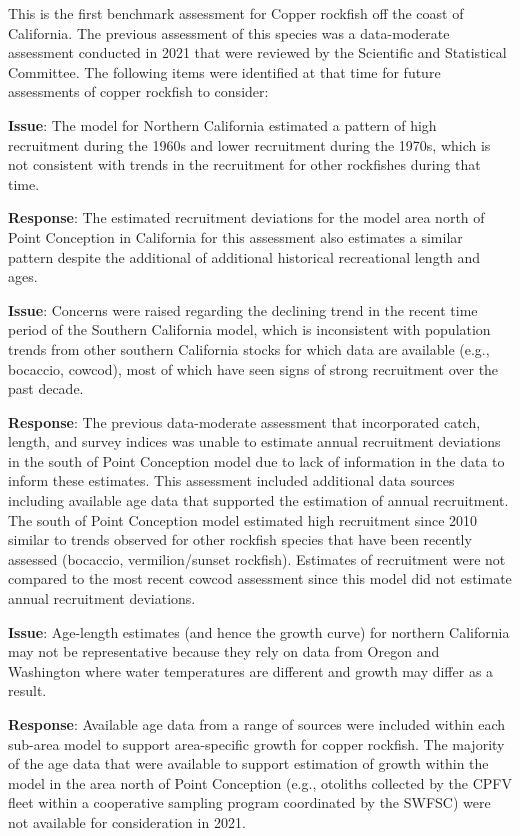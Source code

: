 \documentclass[11pt,
  english,
  letterpaper,
]{article}
\begin{document}
This is the first benchmark assessment for Copper rockfish off the coast of California. The previous assessment of this species was a data-moderate assessment conducted in 2021 that were reviewed by the Scientific and Statistical Committee. The following items were identified at that time for future assessments of copper rockfish to consider:

\textbf{Issue}: The model for Northern California estimated a pattern of high recruitment during the 1960s and lower recruitment during the 1970s, which is not consistent with trends in the recruitment for other rockfishes during that time.

\textbf{Response}: The estimated recruitment deviations for the model area north of Point Conception in California for this assessment also estimates a similar pattern despite the additional of additional historical recreational length and ages.

\textbf{Issue}: Concerns were raised regarding the declining trend in the recent time period of the Southern California model, which is inconsistent with population trends from other southern California stocks for which data are available (e.g., bocaccio, cowcod), most of which have seen signs of strong recruitment over the past decade.

\textbf{Response}: The previous data-moderate assessment that incorporated catch, length, and survey indices was unable to estimate annual recruitment deviations in the south of Point Conception model due to lack of information in the data to inform these estimates. This assessment included additional data sources including available age data that supported the estimation of annual recruitment. The south of Point Conception model estimated high recruitment since 2010 similar to trends observed for other rockfish species that have been recently assessed (bocaccio, vermilion/sunset rockfish). Estimates of recruitment were not compared to the most recent cowcod assessment since this model did not estimate annual recruitment deviations.

\textbf{Issue}: Age-length estimates (and hence the growth curve) for northern California may not be representative because they rely on data from Oregon and Washington where water temperatures are different and growth may differ as a result.

\textbf{Response}: Available age data from a range of sources were included within each sub-area model to support area-specific growth for copper rockfish. The majority of the age data that were available to support estimation of growth within the model in the area north of Point Conception (e.g., otoliths collected by the CPFV fleet within a cooperative sampling program coordinated by the SWFSC) were not available for consideration in 2021.
\end{document}
